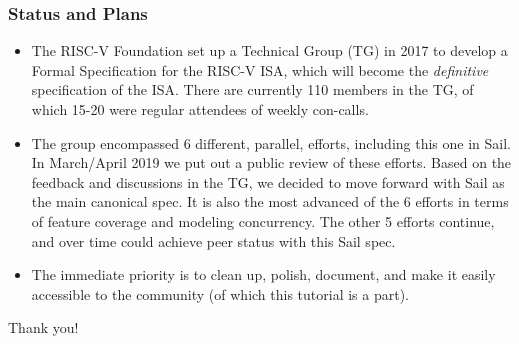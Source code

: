 \documentclass[aspectratio=169]{beamer}
\newcommand{\slidefont}{\scriptsize}
\begin{document}
\begin{frame}[fragile]
  \frametitle{Status and Plans}

  \slidefont

  \begin{itemize}
  \item
    The RISC-V Foundation set up a Technical Group (TG) in 2017 to
    develop a Formal Specification for the RISC-V ISA, which will
    become the \emph{definitive} specification of the ISA.  There are
    currently 110 members in the TG, of which 15-20 were regular
    attendees of weekly con-calls.

  \item 
    The group encompassed 6 different, parallel, efforts, including
    this one in Sail.  In March/April 2019 we put out a public review
    of these efforts.  Based on the feedback and discussions in the
    TG, we decided to move forward with Sail as the main canonical
    spec. It is also the most advanced of the 6 efforts in terms of
    feature coverage and modeling concurrency.  The other 5 efforts
    continue, and over time could achieve peer status with this Sail
    spec.

  \item
    The immediate priority is to clean up, polish, document, and make
    it easily accessible to the community (of which this tutorial is a
    part).

  \end{itemize}

\end{frame}


\begin{frame}[fragile]

  \slidefont

  \vfill

  \begin{center}\LARGE
    Thank you!
  \end{center}

  \vfill

  \begin{block}{}
    
  \end{block}

\end{frame}

\end{document}
